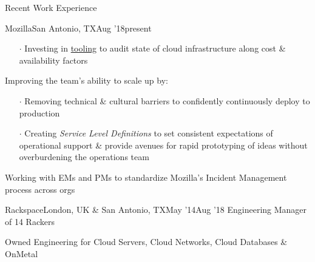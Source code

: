 \documentclass{resume} %
\begin{document}
\begin{rSection}{Recent Work Experience}
\begin{rSubsection}{Mozilla}{San Antonio, TX}{Aug '18}{present}
\begin{itemize}
    \item[$\cdot$] Investing in \href{https://github.com/mozilla/frost}{tooling} to audit state of cloud infrastructure along cost \& availability factors
    \end{itemize}
  \item Improving the team's ability to scale up by:
     \vspace{-0.5em}
    \begin{itemize} \itemsep0.5pt \parskip0pt 
  \item[$\cdot$] Removing technical \& cultural barriers to confidently continuously deploy to production
  \item[$\cdot$] Creating \textit{Service Level Definitions} to set consistent expectations of operational support \& provide avenues for rapid prototyping of ideas without overburdening the operations team
        \end{itemize}
  \item Working with EMs and PMs to standardize Mozilla's Incident Management process across orgs
\end{rSubsection}


\begin{rSubsection}{Rackspace}{London, UK \& San Antonio, TX}{May '14}{Aug '18}
  {Engineering Manager of 14 Rackers}
  \item Owned Engineering for Cloud Servers, Cloud Networks, Cloud Databases \& OnMetal



\end{rSubsection}
\end{rSection}
\end{document}
